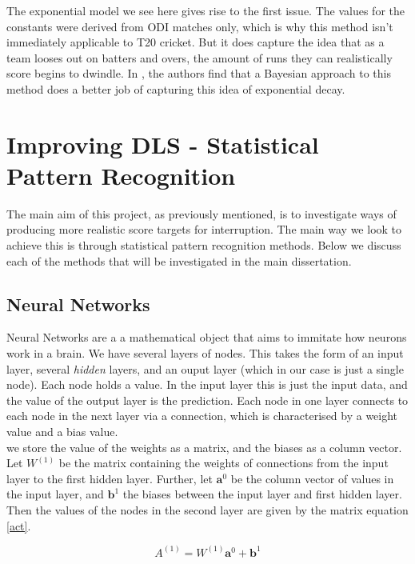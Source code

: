 \documentclass[11pt]{amsart}
\begin{document}
The exponential model we see here gives rise to the first issue. The values for the constants were derived from ODI matches only, which is why this method 
isn't immediately applicable to T20 cricket. But it does capture the idea that as a team looses out on batters and overs, the amount of runs they can realistically score
begins to dwindle. In \cite{dlbayes}, the authors find that a Bayesian approach to this method does a better job of capturing this idea of exponential decay. 


\section{Improving DLS - Statistical Pattern Recognition}

The main aim of this project, as previously mentioned, is to investigate ways of producing more realistic score targets for interruption. The main way we look to 
achieve this is through statistical pattern recognition methods. Below we discuss each of the methods that will be investigated in the main dissertation.

\subsection{Neural Networks}
Neural Networks are a a mathematical object that aims to immitate how neurons work in a brain. We have several layers of nodes. This takes the form of an input layer,
several \textit{hidden} layers, and an ouput layer (which in our case is just a single node). Each node holds a value. In the input layer this is just the input data, and the value of the output layer is the prediction.
Each node in one layer connects to each node in the next layer via a connection, which is characterised by a weight value and a bias value. \\

we store the value of the weights as a matrix, and the biases as a column vector. Let $W^{(1)}$ be the matrix containing the weights of connections from the input layer to the first hidden layer. Further, let
$\textbf{a}^0$ be the column vector of values in the input layer, and $\textbf{b}^1$ the biases between the input layer and first hidden layer. Then the values of the nodes in the second 
layer are given by the matrix equation \ref{act}.

\begin{equation}
    \label{act}
    A^{(1)} = W^{(1)}\textbf{a}^0 + \textbf{b}^1
\end{equation}
\end{document}
